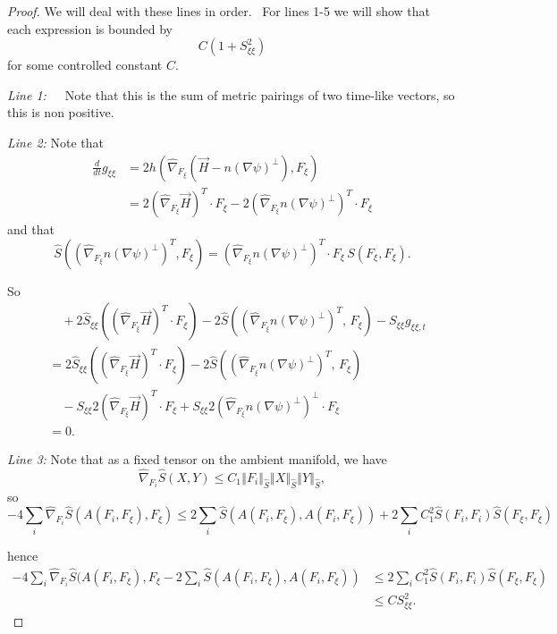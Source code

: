 \documentclass[10pt,a4paper]{amsart}
\newcommand{\maxidx}{\mathord{\xi}} %
\begin{document}
\begin{proof}
We will deal with these lines in order. \ For lines 1-5 we will show that each
expression is bounded by%
\[
C(1+S_{\maxidx\maxidx}^{2})
\]
for some controlled constant $C.$

\textit{Line 1:}\ \ \ Note that this is the sum of metric pairings of two time-like
vectors, so this is non positive.

\textit{Line 2:} Note that
\begin{align*}
\frac{d}{dt}g_{\maxidx\maxidx} 
&=2h(\hat{\nabla}_{F_{\maxidx}}\left(  \vec{H}-n\left(
\nabla\psi\right)  ^{\perp}\right)  ,F_{\maxidx})\\
&=2(\hat{\nabla}_{F_{\maxidx}}\vec{H})^{T}\cdot F_{\maxidx}
   -2\left(  \hat{\nabla}%
_{F_{\maxidx}}n\left(  \nabla\psi\right)  ^{\perp}\right)  ^{T}\cdot F_{\maxidx}
\end{align*}
and that
\[
\hat{S}\left(  (\hat{\nabla}_{F_{\maxidx}}n\left(  \nabla\psi\right)  ^{\perp}%
)^{T},F_{\maxidx}\right)
=(\hat{\nabla}_{F_{\maxidx}}n\left(  \nabla\psi\right)  ^{\perp})^{T}
\cdot F_{\maxidx}\, S(F_{\maxidx},F_{\maxidx}).
\]

So
\begin{align*}
&\quad 
+2\hat{S}_{\maxidx\maxidx}\left( (\hat{\nabla}_{F_{\maxidx}}\vec{H})^{T}\!\cdot F_{\maxidx}\right)
-2\hat{S}\!\left( (\hat{\nabla}_{F_{\maxidx}} n(\nabla\psi)^{\perp})^{T},\,F_{\maxidx}\right)
-S_{\maxidx\maxidx} g_{\maxidx\maxidx,t}
\\[0.5em]
&= 
2\hat{S}_{\maxidx\maxidx}\left( (\hat{\nabla}_{F_{\maxidx}}\vec{H})^{T}\!\cdot F_{\maxidx}\right)
-2\hat{S}\!\left( (\hat{\nabla}_{F_{\maxidx}} n(\nabla\psi)^{\perp})^{T},\,F_{\maxidx}\right)
\\
&\quad 
-S_{\maxidx\maxidx} 2(\hat{\nabla}_{F_{\maxidx}}\vec{H})^{T}\!\cdot F_{\maxidx}
+S_{\maxidx\maxidx} 2\left( \hat{\nabla}_{F_{\maxidx}} n(\nabla\psi)^{\perp} \right)^{\perp}\!\cdot F_{\maxidx}
\\[0.5em]
&=0.
\end{align*}

\textit{Line 3:} Note that as a fixed tensor on the ambient manifold, we have
\[
\hat{\nabla}_{F_{i}}\hat{S}(X,Y)
\leq C_{1}\left\Vert F_{i}\right\Vert
_{\hat{S}}\left\Vert X\right\Vert _{\hat{S}}\left\Vert Y\right\Vert _{\hat{S}},
\]
so
\[
-4\sum_{i}\hat{\nabla}_{F_{i}}\hat{S}(A(F_{i},F_{\maxidx}),F_{\maxidx})
\leq
2\sum_{i}\hat{S}(A(F_{i},F_{\maxidx}),A(F_{i},F_{\maxidx}))
+2\sum_{i}C_{1}^{2}\hat{S}(F_{i},F_{i})\hat{S}(F_{\maxidx},F_{\maxidx})
\]

hence
\begin{align*}
-4\sum_{i}\hat{\nabla}_{F_{i}}\hat{S}(A(F_{i},F_{\maxidx}),F_{\maxidx}
-2\sum_{i}\hat{S}(A(F_{i},F_{\maxidx}),A(F_{i},F_{\maxidx}))  
&\leq 2\sum_{i}C_{1}^{2}\hat{S}(F_{i},F_{i})\hat{S}(F_{\maxidx},F_{\maxidx})\\
&\leq C S_{\maxidx\maxidx}^{2}.
\end{align*}


\end{proof}
\end{document}
